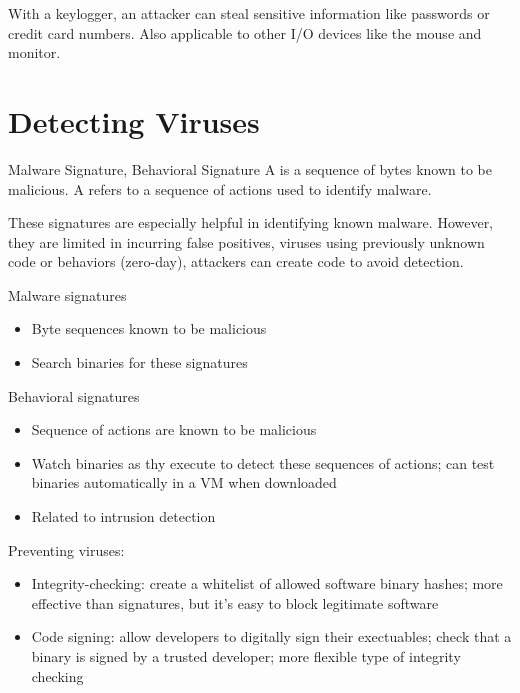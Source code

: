 With a keylogger, an  attacker can steal sensitive information like passwords or credit card numbers. Also applicable to other I/O devices like the mouse and monitor.

\section{Detecting Viruses}

\begin{dfnbox}{Malware Signature, Behavioral Signature}{}
    A  is a sequence of bytes known to be malicious. A  refers to a sequence of actions used to identify malware.
\end{dfnbox}

These signatures are especially helpful in identifying known malware. However, they are limited in incurring false positives, viruses using previously unknown code or behaviors (zero-day), attackers can create code to avoid detection.

Malware signatures
\begin{itemize}
    \item Byte sequences known to be malicious
    \item Search binaries for these signatures
\end{itemize}

Behavioral signatures
\begin{itemize}
    \item Sequence of actions are known to be malicious
    \item Watch binaries as thy execute to detect these sequences of actions; can test binaries automatically in a VM when downloaded
    \item Related to intrusion detection
\end{itemize}



Preventing viruses:
\begin{itemize}
    \item Integrity-checking: create a whitelist of allowed software binary hashes; more effective than signatures, but it's easy to block legitimate software
    \item Code signing: allow developers to digitally sign their exectuables; check that a binary is signed by a trusted developer; more flexible type of integrity checking
\end{itemize}

